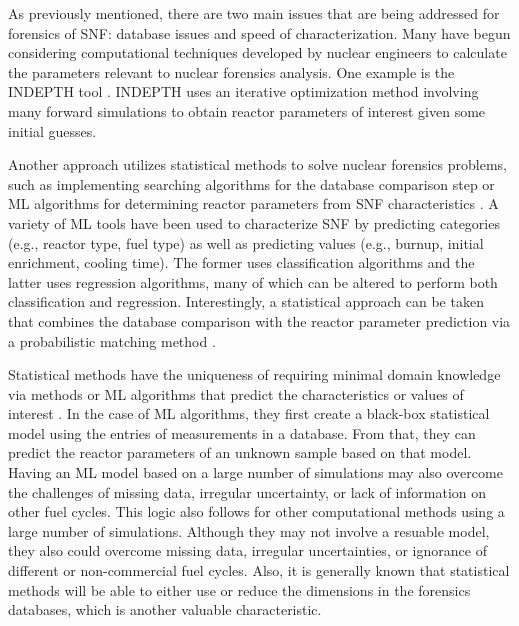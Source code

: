 As previously mentioned, there are two main issues that are being addressed for
forensics of \gls{SNF}: database issues and speed of characterization.  Many
have begun considering computational techniques developed by nuclear engineers
to calculate the parameters relevant to nuclear forensics analysis.  One
example is the \gls{INDEPTH} tool \cite{weber_2006, weber_2010, weber_2011}.
\gls{INDEPTH} uses an iterative optimization method involving many forward
simulations to obtain reactor parameters of interest given some initial
guesses. 

Another approach utilizes statistical methods to solve nuclear forensics
problems, such as implementing searching algorithms for the database comparison
step \cite{gey_search} or \gls{ML} algorithms for determining reactor
parameters from \gls{SNF} characteristics \cite{dayman_feasibility_2013,
nicolaou_2006, nicolaou_2009, nicolaou_2014, robel_2009, pu_discrimination,
jones_viz_2014, jones_snf_2014}.  A variety of \gls{ML} tools have been used to
characterize \gls{SNF} by predicting categories (e.g., reactor type, fuel type)
as well as predicting values (e.g., burnup, initial enrichment, cooling time).
The former uses classification algorithms and the latter uses regression
algorithms, many of which can be altered to perform both classification and
regression.  Interestingly, a statistical approach can be taken that combines
the database comparison with the reactor parameter prediction via a
probabilistic matching method \cite{tamu_method}. 

Statistical methods have the uniqueness of requiring minimal domain knowledge
via methods or \gls{ML} algorithms that predict the characteristics or values
of interest \cite{dayman_feasibility_2013, pu_discrimination, robel_2009,
nicolaou_2006, nicolaou_2009, nicolaou_2014, jones_snf_2014, jones_viz_2014}.
In the case of \gls{ML} algorithms, they first create a black-box statistical
model using the entries of measurements in a database. From that, they can
predict the reactor parameters of an unknown sample based on that model.
Having an \gls{ML} model based on a large number of simulations may also
overcome the challenges of missing data, irregular uncertainty, or lack of
information on other fuel cycles.  This logic also follows for other
computational methods using a large number of simulations.  Although they may
not involve a resuable model, they also could overcome missing data, irregular
uncertainties, or ignorance of different or non-commercial fuel cycles.  Also,
it is generally known that statistical methods will be able to either use or
reduce the dimensions in the forensics databases, which is another valuable
characteristic. 
